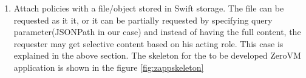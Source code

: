 \begin{enumerate}

  \item Attach policies with a file/object stored in Swift storage. The  file can be requested as it it, or it can be partially requested by specifying query parameter(JSONPath in our case) and instead of having the full content, the requester may get selective content based on his acting role. This case is explained in the above section. The skeleton for the to be developed ZeroVM application is shown in the figure \ref{fig:zappskeleton}



\end{enumerate}









